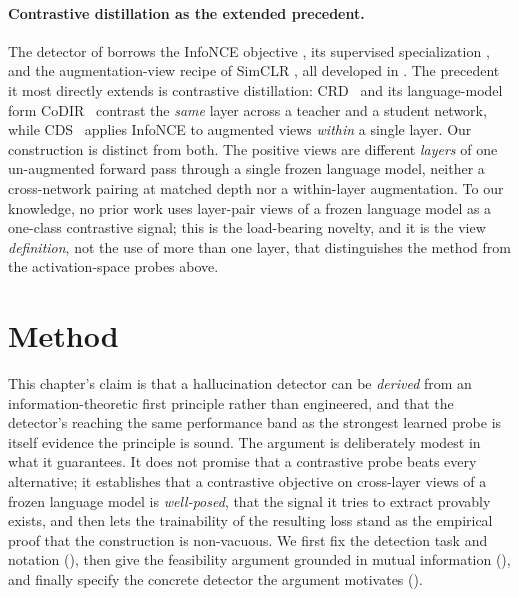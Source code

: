 \paragraph{Contrastive distillation as the extended precedent.}
The detector of  borrows the InfoNCE objective
\citep{oord2018representation}, its supervised specialization
\citep{khosla2020supervised}, and the augmentation-view recipe of SimCLR
\citep{chen2020simclr}, all developed in . The precedent it
most directly extends is contrastive distillation: CRD~\citep{tian2020crd} and its
language-model form CoDIR~\citep{sun2020codir} contrast the \emph{same} layer
across a teacher and a student network, while CDS~\citep{zhang2022cds} applies
InfoNCE to augmented views \emph{within} a single layer. Our construction is
distinct from both. The positive views are different \emph{layers} of one
un-augmented forward pass through a single frozen language model, neither a
cross-network pairing at matched depth nor a within-layer augmentation. To our
knowledge, no prior work uses layer-pair views of a frozen language model as a
one-class contrastive signal; this is the load-bearing novelty, and it is the view
\emph{definition}, not the use of more than one layer, that distinguishes the
method from the activation-space probes above.

\section{Method}
\label{sec:hd:method}

This chapter's claim is that a hallucination detector can be \emph{derived} from
an information-theoretic first principle rather than engineered, and that the
detector's reaching the same performance band as the strongest learned probe is
itself evidence the principle is sound. The argument is deliberately modest in
what it guarantees. It does not promise that a contrastive probe beats every
alternative; it establishes that a contrastive objective on cross-layer views of
a frozen language model is \emph{well-posed}, that the signal it tries to extract
provably exists, and then lets the trainability of the resulting loss stand as
the empirical proof that the construction is non-vacuous. We first fix the
detection task and notation (), then give the feasibility
argument grounded in mutual information (), and finally
specify the concrete detector the argument motivates ().

